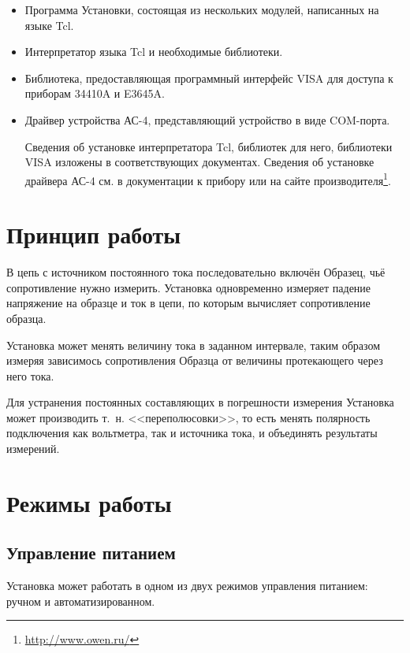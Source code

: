 \documentclass[12pt, a4paper, twocolumn]{report}
\begin{document}
\begin{itemize}

\item Программа Установки, состоящая из нескольких модулей, написанных на языке Tcl.

\item Интерпретатор языка Tcl и необходимые библиотеки.

\item Библиотека, предоставляющая программный интерфейс VISA для доступа к приборам 34410A и E3645A.

\item Драйвер устройства АС-4, представляющий устройство в виде COM-порта.

Сведения об установке интерпретатора Tcl, библиотек для него, библиотеки VISA изложены в соответствующих документах. Сведения об установке драйвера АС-4 см. в документации к прибору или на сайте производителя\footnote{\href{http://www.owen.ru/}{http://www.owen.ru/}}.

\end{itemize}

\section{Принцип работы}

В цепь с источником постоянного тока последовательно включён Образец, чьё сопротивление нужно измерить. Установка одновременно измеряет падение напряжение на образце и ток в цепи, по которым вычисляет сопротивление образца.

Установка может менять величину тока в заданном интервале, таким образом измеряя зависимось сопротивления Образца от величины протекающего через него тока.

Для устранения постоянных составляющих в погрешности измерения Установка может производить т.~н. <<переполюсовки>>, то есть менять полярность подключения как вольтметра, так и источника тока, и объединять результаты измерений. 

\section{Режимы работы}

\subsection{Управление питанием}

Установка может работать в одном из двух режимов управления питанием: ручном и автоматизированном.
\end{document}
